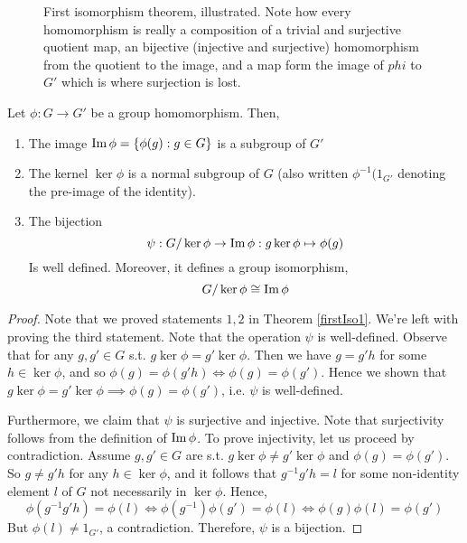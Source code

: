 \begin{figure}[htpb]
    \centering
    \caption{First isomorphism theorem, illustrated. Note how every homomorphism is really
    a composition of a trivial and surjective quotient map, an bijective (injective and
    surjective) homomorphism from the quotient to the image, and a map form the image of
    $phi$ to $G'$ which is where surjection is lost.} 
    \label{fig:isomorphism-theorem}
\end{figure}


\begin{theorem} 
  Let $\phi:G\to G'$ be a group homomorphism. Then,
  \begin{enumerate}
    \item The image $\operatorname{Im}\phi=\left\{ \phi(g) : g\in G \right\}$ is a subgroup of $G'$
    \item The kernel $\ker\phi$ is a normal subgroup of $G$ (also written
        $\phi^{-1}(1_{G'}$ denoting the pre-image of the identity).
    \item The bijection 
      \[\psi: G/\ker\phi\to\operatorname{Im}\phi : g \ker\phi\mapsto \phi(g)\]
      Is well defined. Moreover, it defines a group isomorphism,
      \[G/\ker\phi \cong \operatorname{Im}\phi\]
  \end{enumerate}
  \label{firstIso}
\end{theorem}
\begin{proof}
  Note that we proved statements $1,2$ in Theorem \ref{firstIso1}. We're left with proving
  the third statement. Note that the operation $\psi$ is well-defined. Observe that for
  any $g,g'\in G$ s.t. $g\ker\phi=g'\ker\phi$. Then we have $g=g'h$ for some
  $h\in\ker\phi$, and so $\phi(g)=\phi(g'h) \iff \phi(g)=\phi(g')$. Hence we shown that
  $g\ker\phi=g'\ker\phi \implies \phi(g)=\phi(g')$, i.e. $\psi$ is well-defined.

  Furthermore, we claim that $\psi$ is surjective and injective. Note that surjectivity
  follows from the definition of $\operatorname{Im}\phi$. To prove injectivity, let us proceed by
  contradiction. Assume $g,g'\in G$ are s.t. $g\ker\phi\neq g'\ker\phi$ and
  $\phi(g)=\phi(g')$. So $g\neq g'h$ for any $h\in\ker\phi$, and it follows that
  $g^{-1}g'h=l$ for some non-identity element $l$ of $G$ not necessarily in $\ker\phi$. Hence,
  \[\phi(g^{-1}g'h) = \phi(l) \iff \phi(g^{-1})\phi(g') = \phi(l) \iff
  \phi(g)\phi(l)=\phi(g')\]
  But $\phi(l)\neq 1_{G'}$, a contradiction. Therefore, $\psi$ is a bijection.
\end{proof}
